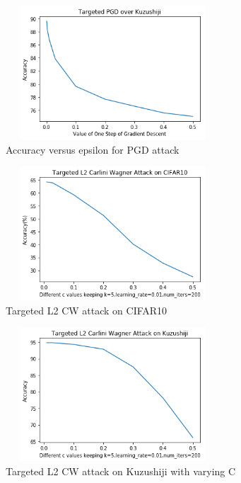 \documentclass[11pt]{article}
\begin{document}
\begin{center}
        \begin{figure}[!h]
        \centering
          \includegraphics[width=80mm, height=50mm]{kuzushiji_targetedpgd.png}
          \caption{ Accuracy versus epsilon for PGD attack
          }
          \label{fig:Piston}
        \end{figure}
\end{center}
\pagebreak

\begin{center}
        \begin{figure}[!h]
        \centering
          \includegraphics[width=80mm, height=50mm]{CIFAR10_CW.png}
          \caption{ Targeted L2 CW attack on CIFAR10
          }
          \label{fig:Piston}
        \end{figure}
\end{center}

\begin{center}
        \begin{figure}[!h]
        \centering
          \includegraphics[width=80mm, height=50mm]{CW_kuzu_C_value.png}
          \caption{ Targeted L2 CW attack on Kuzushiji with varying C
          }
          \label{fig:Piston}
        \end{figure}
\end{center}
\end{document}
